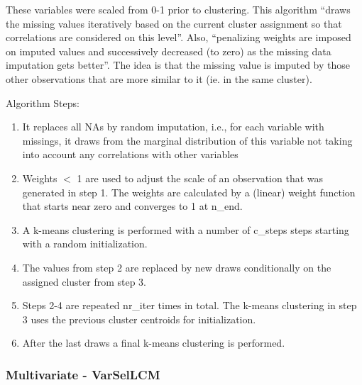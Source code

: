 \documentclass[11pt, a4paper]{article}
\begin{document}
These variables were scaled from 0-1 prior to clustering.
This algorithm ``draws the missing values iteratively based on the current cluster assignment so that correlations are considered on this level''. Also, ``penalizing weights are imposed on imputed values and successively decreased (to zero) as the missing data imputation gets better''. The idea is that the missing value is imputed by those other observations that are more similar to it (ie. in the same cluster).
\par
Algorithm Steps:
\begin{enumerate}
\item It replaces all NAs by random imputation, i.e., for each variable with missings, it draws from the marginal distribution of this variable not taking into account any correlations with other variables
\item Weights $<$ 1 are used to adjust the scale of an observation that was generated in step 1. The weights are calculated by a (linear) weight function that starts near zero and converges to 1 at n\_end.
\item A k-means clustering is performed with a number of c\_steps steps starting with a random initialization.
\item The values from step 2 are replaced by new draws conditionally on the assigned cluster from step 3.
\item Steps 2-4 are repeated nr\_iter times in total. The k-means clustering in step 3 uses the previous cluster centroids for initialization.
\item After the last draws a final k-means clustering is performed.
\end{enumerate}






\subsubsection{Multivariate - VarSelLCM}
\end{document}
